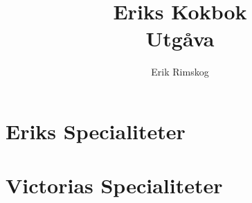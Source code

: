 \documentclass[12pt,a4paper]{article}
\title{\Huge Eriks Kokbok\\\medskip
  \large Utgåva \version\qualifier\\\smallskip
  \small\texttt\shortHEAD}
\author{Erik Rimskog}
\newcommand{\includerecipe}[1]{}
\begin{document}
\maketitle
\thispagestyle{empty}
\newpage
\tableofcontents
\newpage
\part{Eriks Specialiteter}
\includerecipe{korvstroganoff}
\includerecipe{pannkakor}
\includerecipe{carbonara}
\includerecipe{teriyaki}
\includerecipe{köttfärssås}

\part{Victorias Specialiteter}
\includerecipe{linscurry}
\includerecipe{vegetarisk-lasagne}
\includerecipe{tandoorigryta}
\end{document}
